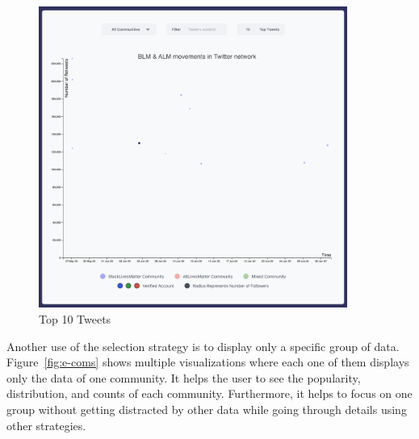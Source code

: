 \begin{figure}[H]
\centering
\captionsetup{justification=centering}
\includegraphics[width=0.9\textwidth]{./pics/top10.png}
\caption{Top 10 Tweets}
\label{fig:top-10}
\end{figure}


Another use of the selection strategy is to display only a specific group of data. Figure~\ref{fig:e-coms} shows multiple visualizations where each one of them displays only the data of one community. It helps the user to see the popularity, distribution, and counts of each community. Furthermore, it helps to focus on one group without getting distracted by other data while going through details using other strategies. 

